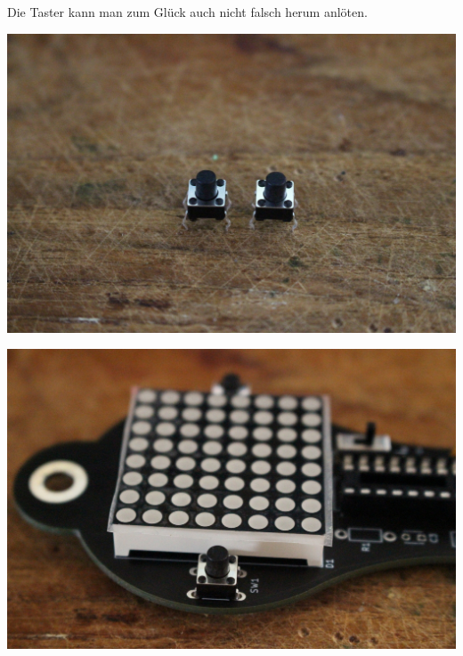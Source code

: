 \documentclass{article}
\begin{document}
Die Taster kann man zum Glück auch nicht falsch herum anlöten.

\vspace{1cm}

\begin{minipage}[b]{0.5\textwidth}
	\includegraphics[width=\textwidth]{Bilder2022/IMG_8231.JPG}
\end{minipage}
\begin{minipage}[b]{0.5\textwidth}
	\includegraphics[width=\textwidth]{Bilder2022/IMG_8232.JPG}
\end{minipage}

\vspace{0.5cm}
\end{document}

